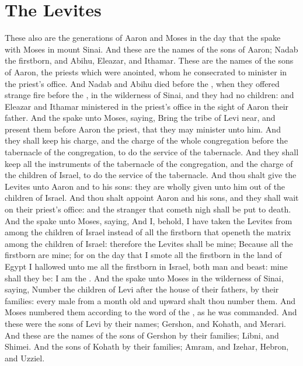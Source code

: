 \section*{The Levites}
\begin{biblechapter} %
\verse These also are the generations of Aaron and Moses in the day that the \LORD spake with Moses in mount Sinai.
\verse And these are the names of the sons of Aaron; Nadab the firstborn, and Abihu, Eleazar, and Ithamar.
\verse These are the names of the sons of Aaron, the priests which were anointed, whom he consecrated to minister in the priest's office.
\verse And Nadab and Abihu died before the \LORD, when they offered strange fire before the \LORD, in the wilderness of Sinai, and they had no children: and Eleazar and Ithamar ministered in the priest's office in the sight of Aaron their father.
\verse And the \LORD spake unto Moses, saying,
\verse Bring the tribe of Levi near, and present them before Aaron the priest, that they may minister unto him.
\verse And they shall keep his charge, and the charge of the whole congregation before the tabernacle of the congregation, to do the service of the tabernacle.
\verse And they shall keep all the instruments of the tabernacle of the congregation, and the charge of the children of Israel, to do the service of the tabernacle.
\verse And thou shalt give the Levites unto Aaron and to his sons: they are wholly given unto him out of the children of Israel.
\verse And thou shalt appoint Aaron and his sons, and they shall wait on their priest's office: and the stranger that cometh nigh shall be put to death.
\verse And the \LORD spake unto Moses, saying,
\verse And I, behold, I have taken the Levites from among the children of Israel instead of all the firstborn that openeth the matrix among the children of Israel: therefore the Levites shall be mine;
\verse Because all the firstborn are mine; for on the day that I smote all the firstborn in the land of Egypt I hallowed unto me all the firstborn in Israel, both man and beast: mine shall they be: I am the \LORD.
\verse And the \LORD spake unto Moses in the wilderness of Sinai, saying,
\verse Number the children of Levi after the house of their fathers, by their families: every male from a month old and upward shalt thou number them.
\verse And Moses numbered them according to the word of the \LORD, as he was commanded.
\verse And these were the sons of Levi by their names; Gershon, and Kohath, and Merari.
\verse And these are the names of the sons of Gershon by their families; Libni, and Shimei.
\verse And the sons of Kohath by their families; Amram, and Izehar, Hebron, and Uzziel.

\end{biblechapter}
